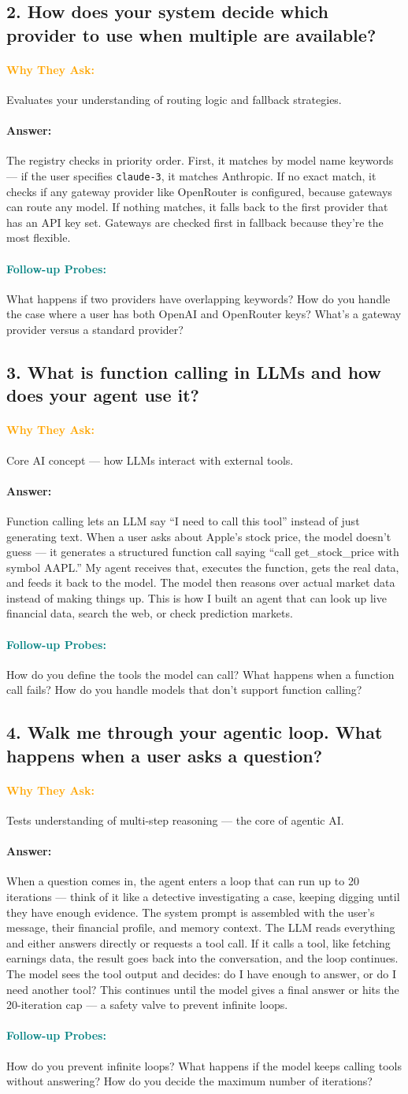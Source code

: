 \documentclass[11pt,a4paper]{article}
\newcommand{\Q}[1]{\subsection{#1}}
\newcommand{\Ans}[1]{\paragraph{\textbf{Answer:}} #1}
\newcommand{\Why}{\paragraph{\textcolor{orange}{\textbf{Why They Ask:}}}}
\newcommand{\Probe}{\paragraph{\textcolor{teal}{\textbf{Follow-up Probes:}}}}
\begin{document}
\Q{2. How does your system decide which provider to use when multiple are available?}
\Why Evaluates your understanding of routing logic and fallback strategies.
\Ans The registry checks in priority order. First, it matches by model name keywords --- if the user specifies \texttt{claude-3}, it matches Anthropic. If no exact match, it checks if any gateway provider like OpenRouter is configured, because gateways can route any model. If nothing matches, it falls back to the first provider that has an API key set. Gateways are checked first in fallback because they're the most flexible.
\Probe What happens if two providers have overlapping keywords? How do you handle the case where a user has both OpenAI and OpenRouter keys? What's a gateway provider versus a standard provider?

\Q{3. What is function calling in LLMs and how does your agent use it?}
\Why Core AI concept --- how LLMs interact with external tools.
\Ans Function calling lets an LLM say ``I need to call this tool'' instead of just generating text. When a user asks about Apple's stock price, the model doesn't guess --- it generates a structured function call saying ``call get\_stock\_price with symbol AAPL.'' My agent receives that, executes the function, gets the real data, and feeds it back to the model. The model then reasons over actual market data instead of making things up. This is how I built an agent that can look up live financial data, search the web, or check prediction markets.
\Probe How do you define the tools the model can call? What happens when a function call fails? How do you handle models that don't support function calling?

\Q{4. Walk me through your agentic loop. What happens when a user asks a question?}
\Why Tests understanding of multi-step reasoning --- the core of agentic AI.
\Ans When a question comes in, the agent enters a loop that can run up to 20 iterations --- think of it like a detective investigating a case, keeping digging until they have enough evidence. The system prompt is assembled with the user's message, their financial profile, and memory context. The LLM reads everything and either answers directly or requests a tool call. If it calls a tool, like fetching earnings data, the result goes back into the conversation, and the loop continues. The model sees the tool output and decides: do I have enough to answer, or do I need another tool? This continues until the model gives a final answer or hits the 20-iteration cap --- a safety valve to prevent infinite loops.
\Probe How do you prevent infinite loops? What happens if the model keeps calling tools without answering? How do you decide the maximum number of iterations?
\end{document}
